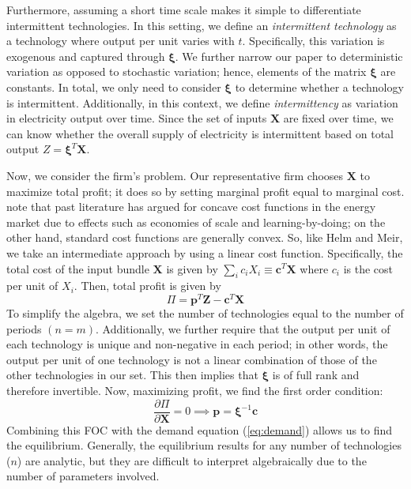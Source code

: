 \documentclass[11pt,a4paper,leqno]{extarticle}
\begin{document}
	Furthermore, assuming a short time scale makes it simple to differentiate intermittent technologies. In this setting, we define an  \textit{intermittent technology} as a technology where output per unit varies with $t$. Specifically, this variation is exogenous and captured through $\boldsymbol{\xi}$. We further narrow our paper to deterministic variation as opposed to stochastic variation; hence, elements of the matrix $\boldsymbol{\xi}$ are constants. In total, we only need to consider $\boldsymbol{\xi}$ to determine whether a technology is intermittent.  Additionally, in this context, we define \textit{intermittency} as variation in electricity output over time. Since the set of inputs $\mathbf{X}$ are fixed over time, we can know whether the overall supply of electricity is intermittent based on total output $Z = \boldsymbol{\xi}^T \mathbf{X}$. 
	
	Now, we consider the firm's problem. Our representative firm chooses $\mathbf{X}$ to maximize total profit; it does so by setting marginal profit equal to marginal cost.  \citet{HH} note that past literature has argued for concave cost functions in the energy market due to effects such as economies of scale and learning-by-doing; on the other hand, standard cost functions are generally convex. So, like Helm and Meir, we take an intermediate approach by using a linear cost function. Specifically, the total cost of the input bundle $\mathbf{X}$ is given by $ \sum_i c_i X_i \equiv \mathbf{c}^T \mathbf{X}$ where $c_i$ is the cost per unit of $X_i$. Then, total profit is given by 
	\begin{equation}
	\Pi = \mathbf{p}^T \mathbf{Z} - \mathbf{c}^T \mathbf{X}
	\end{equation}
	To simplify the algebra, we set the number of technologies equal to the number of periods $(n=m)$. Additionally, we further require that the output per unit of each technology is unique and non-negative in each period; in other words, the output per unit of one technology is not a linear combination of those of the other technologies in our set. This then implies that $\boldsymbol{\xi}$ is of full rank and therefore invertible.  Now, maximizing profit, we find the first order condition:
	\begin{equation}\label{eq:firm_foc}
	\frac{\partial \Pi}{\partial \mathbf{X}} = 0 \implies \mathbf{p} =  \boldsymbol{\xi}^{-1} \mathbf{c}
	\end{equation}
	Combining this FOC with the demand equation (\autoref{eq:demand}) allows us to find the equilibrium. Generally, the equilibrium results for any number of technologies ($n$) are analytic, but they are difficult to interpret algebraically due to the number of parameters involved. 
	
\end{document}
